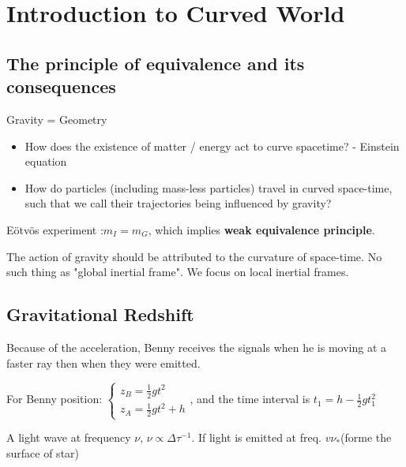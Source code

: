 \newpage

\mainmatter
{}
\chapter{Introduction to Curved World}


\section{The principle of equivalence and its consequences}

Gravity = Geometry
\begin{itemize}
    \item How does the existence of matter / energy act to curve spacetime? - Einstein equation
    \item How do particles (including mass-less particles) travel in curved space-time, such that we call their trajectories being influenced by gravity?
\end{itemize}

Eötvös experiment :$m_{I}=m_{G}$, which implies \textbf{weak equivalence principle}.



The action of gravity should be attributed to the curvature of space-time. No such thing as "global inertial frame". We focus on local inertial frames.

\section{Gravitational Redshift}

Because of the acceleration, Benny receives the signals when he is moving at a faster ray then when they were emitted.

For Benny position: $\begin{cases}z_{B}=\frac{1}{2}gt^{2}\\z_{A}=\frac{1}{2}gt^{2}+h\end{cases}$, and the time interval is $t_{1}=h-\frac{1}{2}gt_{1}^2$ 


A light wave at frequency $\nu$, $\nu \varpropto \Delta \tau^{-1}$. If light is emitted at freq. $v\nu_{*}$(forme the surface of star)

